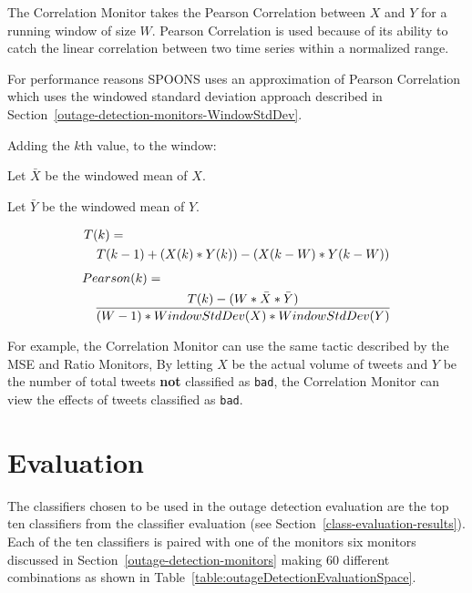 \documentclass[12pt]{ucthesis}
\begin{document}
The Correlation Monitor takes the Pearson Correlation between $X$ and $Y$ for a running window of size $W$.
Pearson Correlation is used because of its ability to catch the linear correlation between two time series within
a normalized range.

For performance reasons SPOONS uses an approximation of Pearson Correlation which uses the windowed standard deviation approach
described in Section~\ref{outage-detection-monitors-WindowStdDev}.

Adding the $k$th value, to the window:
\begin{center}
   Let $\bar{X}$ be the windowed mean of $X$.
\end{center}
\begin{center}
   Let $\bar{Y}$ be the windowed mean of $Y$.
\end{center}
\begin{eqnarray*}
   \lefteqn{T(k) = }\\
   && T(k - 1) + (X(k) * Y(k)) - (X(k - W) * Y(k -W))
\end{eqnarray*}
\begin{eqnarray*}
   \lefteqn{Pearson(k) = }\\
   && \frac{T(k) - (W * \bar{X} * \bar{Y})}{(W - 1) * WindowStdDev(X) * WindowStdDev(Y)}
\end{eqnarray*}


For example, the Correlation Monitor can use the same tactic described by the MSE and Ratio Monitors,
By letting $X$ be the actual volume of tweets and $Y$ be the number of total tweets \textbf{not} classified as \texttt{bad}, the Correlation Monitor can view the effects of tweets classified as \texttt{bad}.

\section{Evaluation}
\label{outage-detection-evaluation}
The classifiers chosen to be used in the outage detection evaluation are the top ten classifiers from the classifier evaluation (see Section~\ref{class-evaluation-results}).
Each of the ten classifiers is paired with one of the monitors six monitors discussed in Section~\ref{outage-detection-monitors} making 60 different combinations as shown in Table~\ref{table:outageDetectionEvaluationSpace}.
\end{document}
